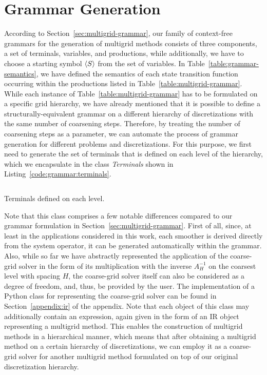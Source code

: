 \section{Grammar Generation}
According to Section~\ref{sec:multigrid-grammar}, our family of context-free grammars for the generation of multigrid methods consists of three components, a set of terminals, variables, and productions, while additionally, we have to choose a starting symbol $\langle S \rangle$ from the set of variables.
In Table~\ref{table:grammar-semantics}, we have defined the semantics of each state transition function occurring within the productions listed in Table~\ref{table:multigrid-grammar}.
While each instance of Table~\ref{table:multigrid-grammar} has to be formulated on a specific grid hierarchy, we have already mentioned that it is possible to define a structurally-equivalent grammar on a different hierarchy of discretizations with the same number of coarsening steps.
Therefore, by treating the number of coarsening steps as a parameter, we can automate the process of grammar generation for different problems and discretizations.
For this purpose, we first need to generate the set of terminals that is defined on each level of the hierarchy, which we encapsulate in the class \emph{Terminals} shown in Listing~\ref{code:grammar:terminals}.
\begin{listing}
	\inputminted{python}{evostencils/grammar/terminals.py}
	\caption{Terminals defined on each level.}
	\label{code:grammar:terminals}
\end{listing}
Note that this class comprises a few notable differences compared to our grammar formulation in Section~\ref{sec:multigrid-grammar}.
First of all, since, at least in the applications considered in this work, each smoother is derived directly from the system operator, it can be generated automatically within the grammar.
Also, while so far we have abstractly represented the application of the coarse-grid solver in the form of its multiplication with the inverse $A^{-1}_H$ on the coarsest level with spacing $H$, the coarse-grid solver itself can also be considered as a degree of freedom, and, thus, be provided by the user.
The implementation of a Python class for representing the coarse-grid solver can be found in Section~\ref{appendix:ir} of the appendix.
Note that each object of this class may additionally contain an expression, again given in the form of an IR object representing a multigrid method.
This enables the construction of multigrid methods in a hierarchical manner, which means that after obtaining a multigrid method on a certain hierarchy of discretizations, we can employ it as a coarse-grid solver for another multigrid method formulated on top of our original discretization hierarchy.

